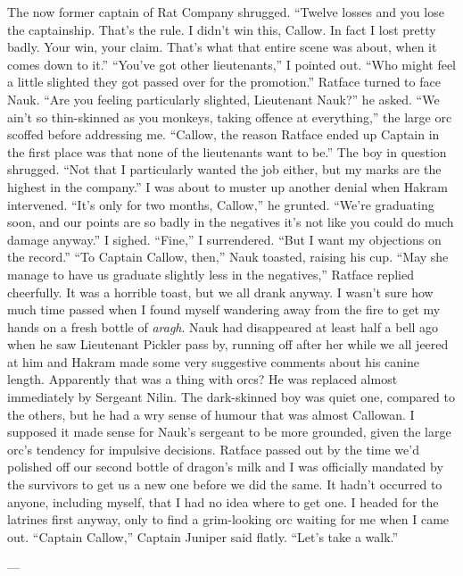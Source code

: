 \documentclass[12pt, openany]{book}
\begin{document}
The now former captain of Rat Company shrugged.
“Twelve losses and you lose the captainship. That’s the rule. I didn’t win this, Callow. In fact I lost pretty badly. Your win, your claim. That’s what that entire scene was about, when it comes down to it.”
“You’ve got other lieutenants,” I pointed out. “Who might feel a little slighted they got passed over for the promotion.”
Ratface turned to face Nauk.
“Are you feeling particularly slighted, Lieutenant Nauk?” he asked.
“We ain’t so thin-skinned as you monkeys, taking offence at everything,” the large orc scoffed before addressing me. “Callow, the reason Ratface ended up Captain in the first place was that none of the lieutenants want to be.”
The boy in question shrugged. “Not that I particularly wanted the job either, but my marks are the highest in the company.”
I was about to muster up another denial when Hakram intervened.
“It’s only for two months, Callow,” he grunted. “We’re graduating soon, and our points are so badly in the negatives it’s not like you could do much damage anyway.”
I sighed.
“Fine,” I surrendered. “But I want my objections on the record.”
“To Captain Callow, then,” Nauk toasted, raising his cup.
“May she manage to have us graduate slightly less in the negatives,” Ratface replied cheerfully.
It was a horrible toast, but we all drank anyway.
I wasn’t sure how much time passed when I found myself wandering away from the fire to get my hands on a fresh bottle of \textit{aragh}. Nauk had disappeared at least half a bell ago when he saw Lieutenant Pickler pass by, running off after her while we all jeered at him and Hakram made some very suggestive comments about his canine length. Apparently that was a thing with orcs? He was replaced almost immediately by Sergeant Nilin. The dark-skinned boy was quiet one, compared to the others, but he had a wry sense of humour that was almost Callowan. I supposed it made sense for Nauk’s sergeant to be more grounded, given the large orc’s tendency for impulsive decisions. Ratface passed out by the time we’d polished off our second bottle of dragon’s milk and I was officially mandated by the survivors to get us a new one before we did the same. It hadn’t occurred to anyone, including myself, that I had no idea where to get one. I headed for the latrines first anyway, only to find a grim-looking orc waiting for me when I came out.
“Captain Callow,” Captain Juniper said flatly. “Let’s take a walk.”

—
\end{document}
